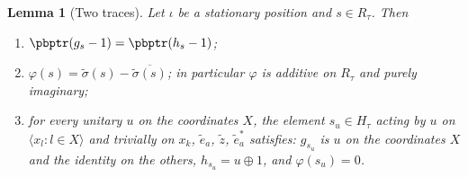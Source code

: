 \documentclass[10pt]{amsart}
\newtheorem{lemma}[theorem]{Lemma}
\theoremstyle{definition}
\theoremstyle{remark}
\providecommand{\aubar}[1]{\overline{#1}}
\begin{document}
\begin{lemma}[Two traces]\label{pbp:traces}
Let $\iota$ be a stationary position and $s\in R_\tau$. Then
\begin{enumerate}
\item[(a)] $\pbptr(g_s-1)=\pbptr(h_s-1)$;
\item[(b)] $\varphi(s)=\tilde\sigma(s)-\aubar{\tilde\sigma(s)}$; in particular $\varphi$ is additive on
$R_\tau$ and purely imaginary;
\item[(c)] for every unitary $u$ on the coordinates $X$, the element $s_u\in H_\tau$ acting by $u$ on
$\langle x_l:l\in X\rangle$ and trivially on $x_k$, $\tilde e_a$, $\tilde z$, $\tilde e_a^*$ satisfies:
$g_{s_u}$ is $u$ on the coordinates $X$ and the identity on the others, $h_{s_u}=u\oplus1$, and
$\varphi(s_u)=0$.
\end{enumerate}
\end{lemma}
\end{document}
